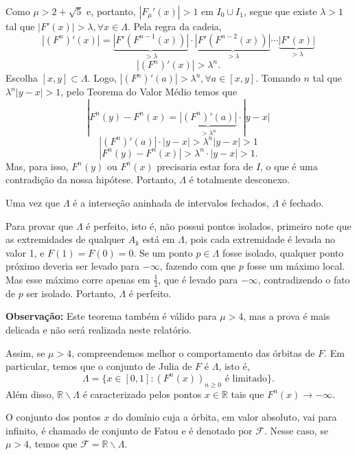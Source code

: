\documentclass[../IC.tex]{subfiles}
\begin{document}
	\begin{prova}
		Como $\mu>2+\sqrt{5}$ e, portanto, $|F_\mu'(x)|>1$ em $I_0 \cup I_1$, segue que existe $\lambda > 1$ tal que $|F'(x)|>\lambda, \forall x \in \Lambda$. Pela regra da cadeia,
		$$|(F^n)'(x)| = \underbrace{|F'(F^{n-1}(x))|}_{> \lambda} \cdot \underbrace{|F'(F^{n-2}(x))|}_{> \lambda} \cdots \underbrace{|F'(x)|}_{> \lambda}$$
		$$|(F^n)'(x)| > \lambda^n.$$
		Escolha $[x,y] \subset \Lambda$. Logo, $|(F^n)'(a)| > \lambda^n, \forall a \in [x,y]$. Tomando $n$ tal que $\lambda^n|y-x| >1$, pelo Teorema do Valor Médio temos que
		$$|F^n(y)-F^n(x)=\underbrace{|(F^n)'(a)|}_{>\lambda^n}\cdot|y-x|$$
		$$|(F^n)'(a)|\cdot|y-x|>\lambda^n|y-x|>1$$
		$$|F^n(y) - F^n(x)| > \lambda^n \cdot |y - x| > 1.$$
		Mas, para isso, $F^n(y)$ ou $F^n(x)$  precisaria estar fora de $I$, o que é uma contradição da nossa hipótese. Portanto, $\Lambda$ é totalmente desconexo.
		
		Uma vez que $\Lambda$ é a interseção aninhada de intervalos fechados, $\Lambda$ é fechado.
		
		Para provar que $\Lambda$ é perfeito, isto é, não possui pontos isolados, primeiro note que as extremidades de qualquer $A_k$ está em $\Lambda$, pois cada extremidade é levada no valor 1, e $F(1) = F(0) = 0$. Se um ponto $p \in \Lambda$ fosse isolado, qualquer ponto próximo deveria ser levado para $-\infty$, fazendo com que $p$ fosse um máximo local. Mas esse máximo corre apenas em $\frac{1}{2}$, que é levado para $-\infty$, contradizendo o fato de $p$ ser isolado. Portanto, $\Lambda$ é perfeito.
	\end{prova}
	
	\textbf{Observação:} Este teorema também é válido para $\mu > 4$, mas a prova é mais delicada e não será realizada neste relatório.
	
	Assim, se $\mu>4$, compreendemos melhor o comportamento das órbitas de $F$. Em particular, temos que o conjunto de Julia de $F$ é $\Lambda$, isto é,
	$$\Lambda=\{x \in [0,1] : (F^n(x))_{n\geq0} \text{ é limitado}\}.$$ Além disso, $\mathbb{R} \backslash \Lambda$ é caracterizado pelos pontos $x\in\mathbb{R}$ tais que $F^n(x) \to -\infty$.
	
	O conjunto dos pontos $x$ do domínio cuja a órbita, em valor absoluto, vai para infinito, é chamado de conjunto de Fatou e é denotado por $\mathcal{F}$. Nesse caso, se $\mu>4$, temos que $\mathcal{F}=\mathbb{R}\backslash\Lambda$.
\end{document}
